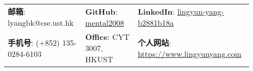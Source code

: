 \documentclass[letterpaper, 10pt]{article}
\begin{document}


\setlength{\tabcolsep}{4pt}


\vspace{0.5cm} 
\begin{center}
\begin{tabular}{lll}
\textbf{邮箱}: lyangbk@cse.ust.hk &
\hspace{0.25in} \textbf{GitHub}: \href{https://github.com/mental2008}{mental2008} &
\hspace{0.1in} \textbf{LinkedIn}: \href{https://www.linkedin.com/in/lingyun-yang-b2881b18a/}{lingyun-yang-b2881b18a} \\

\textbf{手机号}: (+852) 135-0284-6103 &
\hspace{0.25in} \textbf{Office}: CYT 3007, HKUST &
\hspace{0.1in} \textbf{个人网站}: \href{https://www.lingyunyang.com}{https://www.lingyunyang.com} \\ 
\end{tabular}
\end{center}
\end{document}
